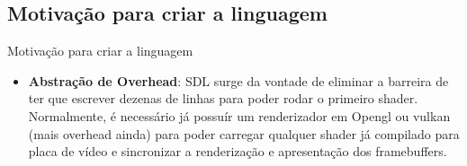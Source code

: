 \documentclass[2pt]{beamer} %
\begin{document}
\subsection{Motivação para criar a linguagem}
\begin{frame}{Motivação para criar a linguagem}

\begin{itemize}
    \item \textbf{Abstração de Overhead}: SDL surge da vontade de eliminar a barreira de ter que escrever dezenas de linhas para poder rodar o primeiro shader. Normalmente, é necessário já possuír um renderizador em Opengl ou vulkan (mais overhead ainda) para poder carregar qualquer shader já compilado para placa de vídeo e sincronizar a renderização e apresentação dos framebuffers.
\end{itemize}
\end{frame}
\end{document}
